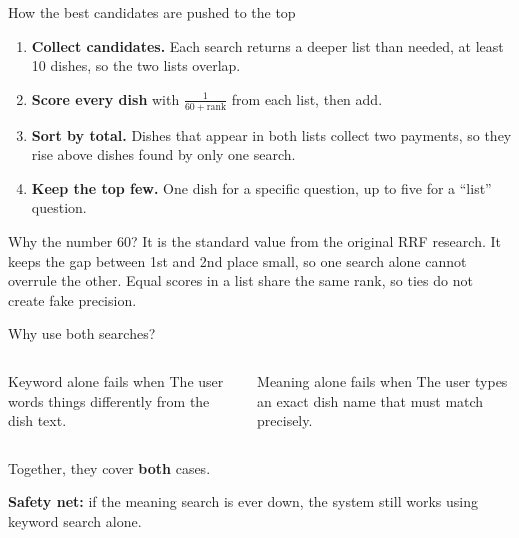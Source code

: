 \documentclass[aspectratio=169,11pt]{beamer}
\newcommand{\key}[1]{\textcolor{ember}{\textbf{#1}}}
\begin{document}
\begin{frame}{How the best candidates are pushed to the top}
  \begin{enumerate}
    \item \key{Collect candidates.} Each search returns a deeper list than needed, at least 10 dishes, so the two lists overlap.
    \item \key{Score every dish} with $\frac{1}{60 + \text{rank}}$ from each list, then add.
    \item \key{Sort by total.} Dishes that appear in \alert{both} lists collect two payments, so they rise above dishes found by only one search.
    \item \key{Keep the top few.} One dish for a specific question, up to five for a ``list'' question.
  \end{enumerate}
  \vspace{0.2cm}
  \begin{block}{Why the number 60?}
    \small It is the standard value from the original RRF research. It keeps the gap between 1st and 2nd place small, so one search alone cannot overrule the other. Equal scores in a list share the same rank, so ties do not create fake precision.
  \end{block}
\end{frame}

\begin{frame}{Why use both searches?}
  \begin{columns}[T]
      \begin{block}{Keyword alone fails when}
        The user words things differently from the dish text.
      \end{block}
      \begin{block}{Meaning alone fails when}
        The user types an exact dish name that must match precisely.
      \end{block}
  \end{columns}
  \vspace{0.4cm}
  \centering
  \Large Together, they cover \key{both} cases.
  \vspace{0.3cm}

  \normalsize
  \textcolor{leaf}{\textbf{Safety net:}} if the meaning search is ever down, the system still works using keyword search alone.
\end{frame}
\end{document}

